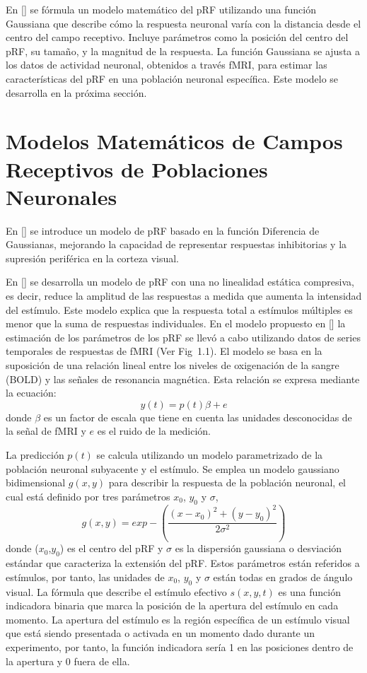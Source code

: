 En [\cite{dumoulin_population_2008}] se f\'ormula un modelo matemático del pRF utilizando una función Gaussiana que describe cómo la respuesta neuronal varía con la distancia desde el centro del campo receptivo. Incluye parámetros como la posición del centro del pRF, su tamaño, y la magnitud de la respuesta. La función Gaussiana se ajusta a los datos de actividad neuronal, obtenidos a través fMRI, para estimar las características del pRF en una población neuronal específica. Este modelo se desarrolla en la próxima sección.


\section{Modelos Matemáticos de Campos Receptivos de Poblaciones Neuronales}

En [\cite{zuiderbaan_modeling_2012}] se introduce un modelo de pRF basado en la función Diferencia de Gaussianas, mejorando la capacidad de representar respuestas inhibitorias y la supresión periférica en la corteza visual.

En [\cite{kay_compressive_2013}] se desarrolla un modelo de pRF con una no linealidad estática compresiva, es decir, reduce la amplitud de las respuestas a medida que aumenta la intensidad del estímulo. Este modelo explica que la respuesta total a estímulos múltiples es menor que la suma de respuestas individuales. En el modelo propuesto en [\cite{dumoulin_population_2008}] la estimación de los parámetros de los pRF se llevó a cabo utilizando datos de series temporales de respuestas de fMRI (Ver Fig 1.1). El modelo se basa en la suposición de una relación lineal entre los niveles de oxigenación de la sangre (BOLD) y las señales de resonancia magnética. Esta relación se expresa mediante la ecuación:
\begin{equation}
	y(t)=p(t)\beta + e
\end{equation}
donde $\beta$ es un factor de escala que tiene en cuenta las unidades desconocidas de la señal de fMRI y $e$ es el ruido de la medición. 

La predicción $p(t)$ se calcula utilizando un modelo parametrizado de la población neuronal subyacente y el estímulo. Se emplea un modelo gaussiano bidimensional $g(x,y)$ para describir la respuesta de la población neuronal, el cual est\'a definido por tres par\'ametros $x_0$,  $y_0$ y $\sigma$,
\begin{equation}
	g(x,y)=exp-(\frac{(x-x_0)^2+(y-y_0)^2}{2\sigma^2})
	\label{gaussian}
\end{equation}
donde ($x_0$,$y_0$) es el centro del pRF y $\sigma$ es la dispersión gaussiana o desviación estándar que caracteriza la extensi\'on del pRF. Estos parámetros están referidos a estímulos, por tanto, las unidades de $x_0$, $y_0$ y $\sigma$ están todas en grados de ángulo visual. La fórmula que describe el estímulo efectivo $s(x,y,t)$ es una función indicadora binaria que marca la posición de la apertura del estímulo en cada momento. La apertura del est\'imulo es la región específica de un estímulo visual que está siendo presentada o activada en un momento dado durante un experimento, por tanto, la función indicadora ser\'ia 1 en las posiciones dentro de la apertura y 0 fuera de ella.

